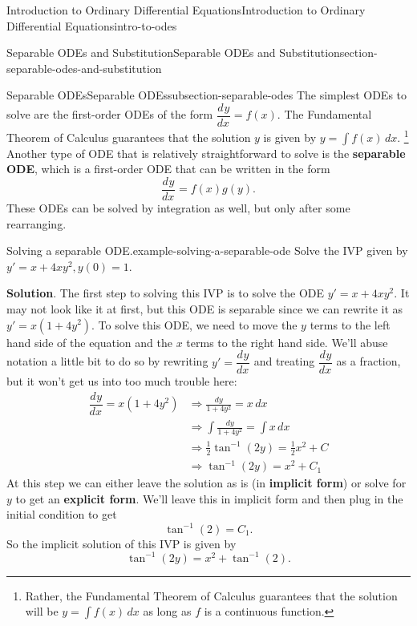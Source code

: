 \documentclass[oneside,10pt,]{book}
\newcommand{\terminology}[1]{\textbf{#1}}
\numberwithin{equation}{section}
\newcommand{\dv}[3][]{\dfrac{d^{#1} #2}{d #3^{#1}}}
\begin{document}
\begin{chapterptx}{Introduction to Ordinary Differential Equations}{}{Introduction to Ordinary Differential Equations}{}{}{intro-to-odes}
\begin{sectionptx}{Separable ODEs and Substitution}{}{Separable ODEs and Substitution}{}{}{section-separable-odes-and-substitution}
\begin{subsectionptx}{Separable ODEs}{}{Separable ODEs}{}{}{subsection-separable-odes}
\hypertarget{p-51}{}%
The simplest ODEs to solve are the first-order ODEs of the form \(\dv{y}{x} = f(x)\). The Fundamental Theorem of Calculus guarantees that the solution \(y\) is given by \(y = \int f(x)\,dx\).%
\footnote{Rather, the Fundamental Theorem of Calculus guarantees that the solution will be \(y=\int f(x)\,dx\) as long as \(f\) is a continuous function.\label{fn-3}}\hypertarget{p-52}{}%
Another type of ODE that is relatively straightforward to solve is the \terminology{separable ODE}, which is a first-order ODE that can be written in the form%
%
\begin{equation*}
\dv{y}{x} = f(x)g(y).
\end{equation*}
\hypertarget{p-53}{}%
These ODEs can be solved by integration as well, but only after some rearranging.%
\begin{example}{Solving a separable ODE.}{example-solving-a-separable-ode}%
\hypertarget{p-54}{}%
Solve the IVP given by \(y' = x+4xy^{2}, y(0)=1\).%
\par\smallskip%
\noindent\textbf{Solution}.\hypertarget{solution-9}{}\quad%
\hypertarget{p-55}{}%
The first step to solving this IVP is to solve the ODE \(y' = x+4xy^{2}\). It may not look like it at first, but this ODE is separable since we can rewrite it as \(y' = x(1+4y^{2})\). To solve this ODE, we need to move the \(y\) terms to the left hand side of the equation and the \(x\) terms to the right hand side. We'll abuse notation a little bit to do so by rewriting \(y' = \dv{y}{x}\) and treating \(\dv{y}{x}\) as a fraction, but it won't get us into too much trouble here:%
%
\begin{align*}
\dv{y}{x} = x(1+4y^{2}) &\Rightarrow \frac{dy}{1+4y^{2}} = x\,dx \\
&\Rightarrow \int\frac{dy}{1+4y^{2}}  = \int x\,dx \\
&\Rightarrow \frac{1}{2}\tan^{-1}(2y)  = \frac{1}{2}x^{2}+C \\
&\Rightarrow \tan^{-1}(2y)  = x^{2}+C_{1} 
\end{align*}
\hypertarget{p-56}{}%
At this step we can either leave the solution as is (in \terminology{implicit form}) or solve for \(y\) to get an \terminology{explicit form}. We'll leave this in implicit form and then plug in the initial condition to get%
\begin{equation*}
\tan^{-1}(2) = C_{1}.
\end{equation*}
So the implicit solution of this IVP is given by%
\begin{equation*}
\tan^{-1}(2y) = x^{2}+\tan^{-1}(2).

\end{equation*}
\end{example}
\end{subsectionptx}
\end{sectionptx}
\end{chapterptx}
\end{document}
